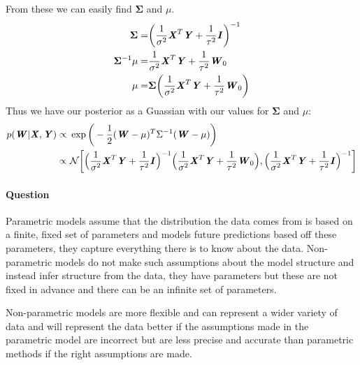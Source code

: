 \documentclass{article}
\newcounter{question}
\newcommand{\question}{\stepcounter{question}\paragraph{Question \thequestion}}
\newcommand{\mat}[1]{\textbf{\textit{#1}}}
\begin{document}
From these we can easily find $\mathbf{\Sigma}$ and $\mu$.
\begin{align*}
	\mathbf{\Sigma} = &\bigg(\frac{1}{\sigma^2}\mat{X}^T\mat{Y}+\frac{1}{\tau^2}\mat{I}\bigg)^{-1} \\
	\mathbf{\Sigma}^{-1}\mu = &\frac{1}{\sigma^2}\mat{X}^T\mat{Y} + \frac{1}{\tau^2}\mat{W}_0 \\
	\mu = &\mathbf{\Sigma}\bigg(\frac{1}{\sigma^2}\mat{X}^T\mat{Y} + \frac{1}{\tau^2}\mat{W}_0\bigg) \\
\end{align*}
Thus we have our posterior as a Guassian with our values for $\mathbf{\Sigma}$ and $\mu$:
\begin{align*}
	p(\mat{W}|\mat{X},\mat{Y}) \propto\ &\exp\bigg(-\frac{1}{2}(\mat{W}-\mu)^T\Sigma^{-1}(\mat{W}-\mu)\bigg)\\
	\propto\ &\mathcal{N}\bigg[\Big(\frac{1}{\sigma^2}\mat{X}^T\mat{Y}+\frac{1}{\tau^2}\mat{I}\Big)^{-1}\Big(\frac{1}{\sigma^2}\mat{X}^T\mat{Y} + \frac{1}{\tau^2}\mat{W}_0\Big),\Big(\frac{1}{\sigma^2}\mat{X}^T\mat{Y}+\frac{1}{\tau^2}\mat{I}\Big)^{-1}\bigg]
\end{align*}
\question Parametric models assume that the distribution the data comes from is based on a finite, fixed set of parameters and models future predictions based off these parameters, they capture everything there is to know about the data. Non-parametric models do not make such assumptions about the model structure and instead infer structure from the data, they have parameters but these are not fixed in advance and there can be an infinite set of parameters.

Non-parametric models are more flexible and can represent a wider variety of data and will represent the data better if the assumptions made in the parametric model are incorrect but are less precise and accurate than parametric methods if the right assumptions are made.
\end{document}
